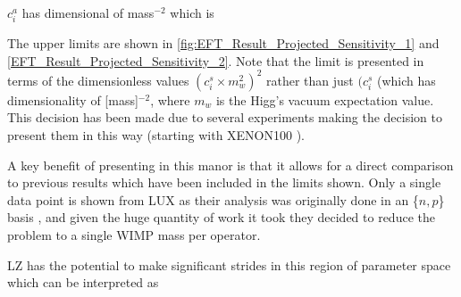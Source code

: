 $c^a_i$ has dimensional of mass$^{-2}$ which is 

The upper limits are shown in \autoref{fig:EFT_Result_Projected_Sensitivity_1} and \autoref{EFT_Result_Projected_Sensitivity_2}.
Note that the limit is presented in terms of the dimensionless values $({c}^{s}_{i}\times{m}^{2}_{w})^{2}$ rather than just $({c}^{s}_{i}$ (which has dimensionality of [mass]$^{-2}$, where $m_w$ is the Higg's vacuum expectation value.
This decision has been made due to several experiments making the decision to present them in this way (starting with XENON100 \cite{xenon100_eft_ref}).
\par
A key benefit of presenting in this manor is that it allows for a direct comparison to previous results which have been included in the limits shown.
Only a single data point is shown from LUX as their analysis was originally done in an \{$n,p$\} basis \cite{LUX_RUN4_EFT_2021}, and given the huge quantity of work it took they decided to reduce the problem to a single WIMP mass per operator.
\par
LZ has the potential to make significant strides in this region of parameter space which can be interpreted as 


